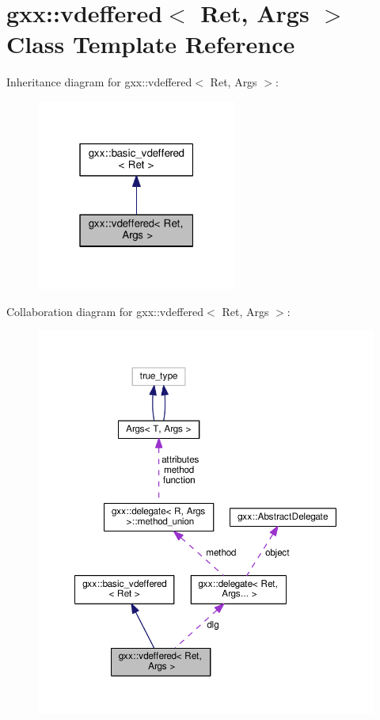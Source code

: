 \hypertarget{classgxx_1_1vdeffered}{}\section{gxx\+:\+:vdeffered$<$ Ret, Args $>$ Class Template Reference}
\label{classgxx_1_1vdeffered}


Inheritance diagram for gxx\+:\+:vdeffered$<$ Ret, Args $>$\+:
\nopagebreak
\begin{figure}[H]
\begin{center}
\leavevmode
\includegraphics[width=187pt]{classgxx_1_1vdeffered__inherit__graph}
\end{center}
\end{figure}


Collaboration diagram for gxx\+:\+:vdeffered$<$ Ret, Args $>$\+:
\nopagebreak
\begin{figure}[H]
\begin{center}
\leavevmode
\includegraphics[width=350pt]{classgxx_1_1vdeffered__coll__graph}
\end{center}
\end{figure}
